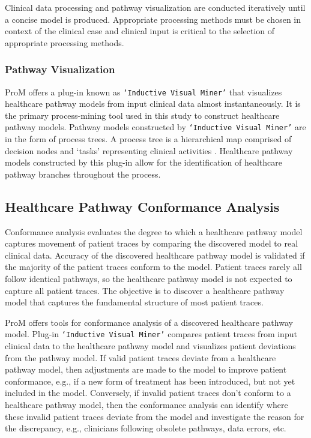 \documentclass{elsarticle}
\begin{document}
Clinical data processing and pathway visualization are conducted iteratively until a concise model is produced. Appropriate processing methods must be chosen in context of the clinical case and clinical input is critical to the selection of appropriate processing methods. 

\subsubsection{Pathway Visualization}
ProM offers a plug-in known as \texttt{`Inductive Visual Miner'} that visualizes healthcare pathway models from input clinical data almost instantaneously. It is the primary process-mining tool used in this study to construct healthcare pathway models. Pathway models constructed by \texttt{`Inductive Visual Miner'} are in the form of process trees. A process tree is a hierarchical map comprised of decision nodes and `tasks' representing clinical activities \cite{25a7fd818bf44606a903d9b78b95cdd3}. Healthcare pathway models constructed by this plug-in allow for the identification of healthcare pathway branches throughout the process.

\subsection{Healthcare Pathway Conformance Analysis}
Conformance analysis evaluates the degree to which a healthcare pathway model captures movement of patient traces by comparing the discovered model to real clinical data. 
Accuracy of the discovered healthcare pathway model is validated if the majority of the patient traces conform to the model. Patient traces rarely all follow identical pathways, so the healthcare pathway model is not expected to capture all patient traces. The objective is to discover a healthcare pathway model that captures the fundamental structure of most patient traces. 

ProM offers tools for conformance analysis of a discovered healthcare pathway model. Plug-in \texttt{`Inductive Visual Miner'} compares patient traces from input clinical data to the healthcare pathway model and visualizes patient deviations from the pathway model. If valid patient traces deviate from a healthcare pathway model, then adjustments are made to the model to improve patient conformance, e.g., if a new form of treatment has been introduced, but not yet included in the model. Conversely, if invalid patient traces don't conform to a healthcare pathway model, then the conformance analysis can identify where these invalid patient traces deviate from the model and investigate the reason for the discrepancy, e.g., clinicians following obsolete pathways, data errors, etc.
\end{document}
